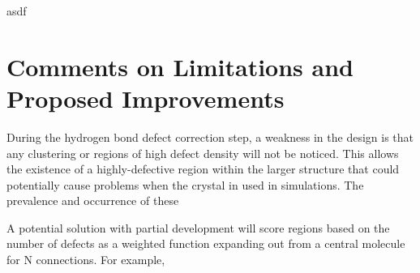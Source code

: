 asdf

\section{Comments on Limitations and Proposed Improvements}

During the hydrogen bond defect correction step, a weakness in the design is that any clustering or regions of high defect density will not be noticed.
This allows the existence of a highly-defective region within the larger structure that could potentially cause problems when the crystal in used in simulations. 
The prevalence and occurrence of these 

A potential solution with partial development will score regions based on the number of defects as a weighted function expanding out from a central molecule for N connections. 
For example, 












